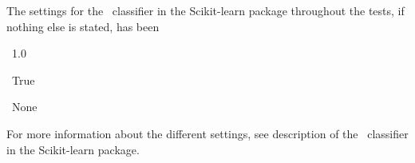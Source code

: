 The settings for the \mn\ \nb classifier in the Scikit-learn package throughout the tests, if nothing else is stated, has been
\begin{description}[noitemsep,labelindent=0.5cm]
\small
	\item[Alpha:] \ 1.0
	\item[Fit prior:]\ True
	\item[Class prior:] \ None
\end{description}
For more information about the different settings, see description of the \mn\ \nb classifier in the Scikit-learn package.